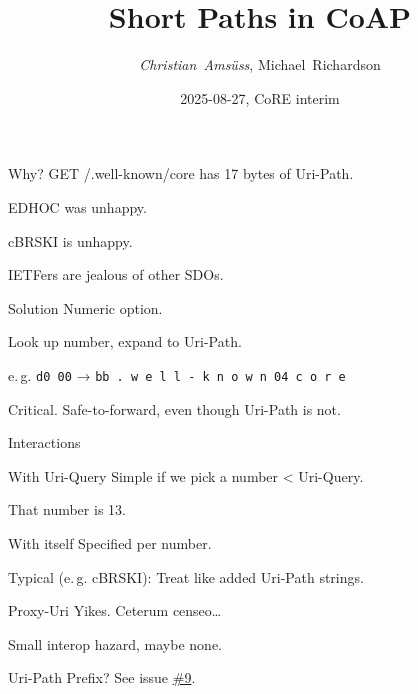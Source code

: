 

\title{Short Paths in CoAP}
\subtitle{}
\author{\textit{Christian~Amsüss}, Michael~Richardson}
\date{2025-08-27, CoRE interim}



\frame{\titlepage}

\begin{frame}{Why?}\Large
  GET /.well-known/core has 17 bytes of Uri-Path.

  \bigskip

  EDHOC was unhappy.

  \bigskip

  cBRSKI is unhappy.

  \bigskip

  IETFers are jealous of other SDOs.
\end{frame}

\begin{frame}{Solution}\Large
  Numeric option.

  \bigskip

  Look up number, expand to Uri-Path.

  e.\,g. \texttt{d0 00} → \texttt{bb . w e l l - k n o w n 04 c o r e}

  \bigskip

  Critical. Safe-to-forward, even though Uri-Path is not.
\end{frame}

\begin{frame}{Interactions}\large
  \begin{block}{With Uri-Query}
    Simple if we pick a number < Uri-Query.

    That number is 13.
  \end{block}

  \begin{block}{With itself}
    Specified per number.

    Typical (e.\,g. cBRSKI): Treat like added Uri-Path strings.
  \end{block}

  \begin{block}{Proxy-Uri}
    Yikes. Ceterum censeo…

    Small interop hazard, maybe none.
  \end{block}

  \begin{block}{Uri-Path}
    Prefix? See issue \href{https://github.com/chrysn/shopinc/issues/9}{\#9}.
  \end{block}
\end{frame}

